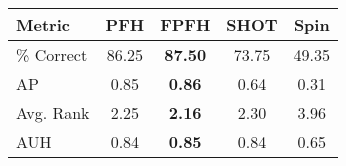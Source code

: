 \begin{tabular}{ | l || c | c | c | c | }
\hline
Metric & PFH & FPFH & SHOT & Spin \\
\hline
 \% Correct & 86.25 & \bf 87.50 & 73.75 & 49.35 \\
AP & 0.85 & \bf 0.86 & 0.64 & 0.31 \\
Avg. Rank & 2.25 & \bf 2.16 & 2.30 & 3.96 \\
AUH & 0.84 & \bf 0.85 & 0.84 & 0.65 \\
\hline
\end{tabular}